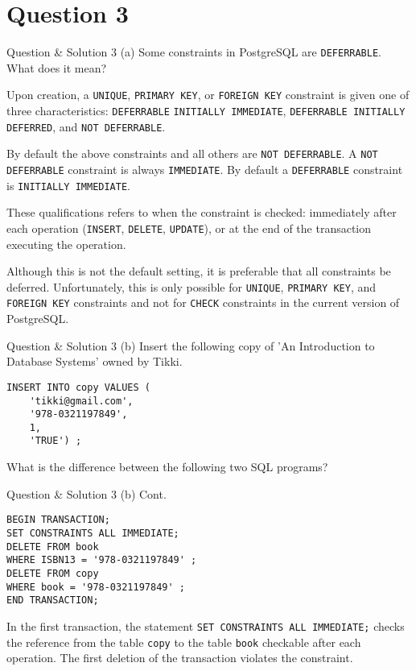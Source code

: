 \section*{Question 3}

\begin{frame}[fragile]{Question \& Solution 3 (a)}
Some constraints in PostgreSQL are \texttt{DEFERRABLE}. What does it mean? \vspace{10pt}

Upon creation, a \texttt{UNIQUE}, \texttt{PRIMARY KEY}, or \texttt{FOREIGN KEY} constraint is given one of three characteristics: \texttt{DEFERRABLE} \texttt{INITIALLY IMMEDIATE}, \texttt{DEFERRABLE INITIALLY DEFERRED}, and \texttt{NOT DEFERRABLE}.  \vspace{10pt}

By default the above constraints and all others are \texttt{NOT DEFERRABLE}. A \texttt{NOT DEFERRABLE} constraint is always \texttt{IMMEDIATE}. By default a \texttt{DEFERRABLE} constraint is \texttt{INITIALLY IMMEDIATE}. \vspace{10pt}

These qualifications refers to when the constraint is checked: immediately after each operation (\texttt{INSERT}, \texttt{DELETE}, \texttt{UPDATE}), or at the end of the transaction executing the operation. \vspace{10pt}

Although this is not the default setting, it is preferable that all constraints be deferred. Unfortunately, this is only possible for \texttt{UNIQUE}, \texttt{PRIMARY KEY}, and \texttt{FOREIGN KEY} constraints and not for \texttt{CHECK} constraints in the current version of PostgreSQL.
\end{frame}


\begin{frame}[fragile]{Question \& Solution 3 (b)}
Insert the following copy of 'An Introduction to Database Systems' owned by Tikki. \vspace{10pt}

\begin{lstlisting}
INSERT INTO copy VALUES (
	'tikki@gmail.com', 
	'978-0321197849', 
	1, 
	'TRUE') ;
\end{lstlisting}

What is the difference between the following two SQL programs?
\end{frame}


\begin{frame}[fragile]{Question \& Solution 3 (b) Cont.}
\begin{lstlisting}
BEGIN TRANSACTION;
SET CONSTRAINTS ALL IMMEDIATE;
DELETE FROM book 
WHERE ISBN13 = '978-0321197849' ;
DELETE FROM copy 
WHERE book = '978-0321197849' ;
END TRANSACTION;
\end{lstlisting}

In the first transaction, the statement \texttt{SET CONSTRAINTS ALL IMMEDIATE;} checks the reference from the table \texttt{copy} to the table \texttt{book} checkable after each operation. The first deletion of the transaction violates the constraint.

\end{frame}



